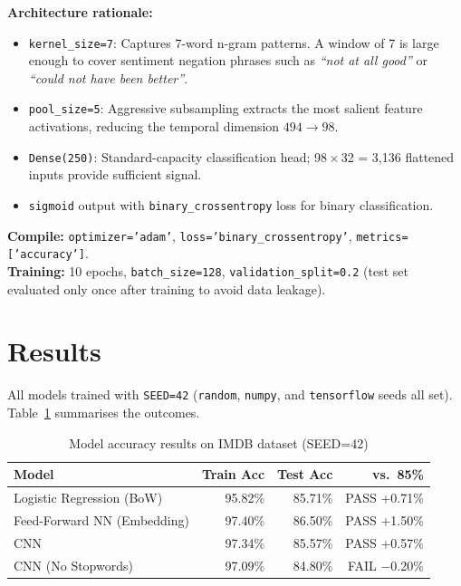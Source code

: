 \documentclass[12pt,a4paper]{article}
\begin{document}
\textbf{Architecture rationale:}
\begin{itemize}
  \item \texttt{kernel\_size=7}: Captures 7-word n-gram patterns. A window of 7 is large
        enough to cover sentiment negation phrases such as \textit{``not at all good''} or
        \textit{``could not have been better''}.
  \item \texttt{pool\_size=5}: Aggressive subsampling extracts the most salient feature
        activations, reducing the temporal dimension $494 \to 98$.
  \item \texttt{Dense(250)}: Standard-capacity classification head; 98\,$\times$\,32 = 3,136
        flattened inputs provide sufficient signal.
  \item \texttt{sigmoid} output with \texttt{binary\_crossentropy} loss for binary
        classification.
\end{itemize}

\textbf{Compile:} \texttt{optimizer='adam'}, \texttt{loss='binary\_crossentropy'},
\texttt{metrics=['accuracy']}.\\
\textbf{Training:} 10 epochs, \texttt{batch\_size=128}, \texttt{validation\_split=0.2}
(test set evaluated only once after training to avoid data leakage).

\section{Results}

All models trained with \texttt{SEED=42} (\texttt{random}, \texttt{numpy}, and
\texttt{tensorflow} seeds all set). Table~\ref{tab:results} summarises the outcomes.

\begin{table}[H]
  \centering
  \caption{Model accuracy results on IMDB dataset (SEED=42)}
  \label{tab:results}
  \begin{tabular}{lrrr}
    \toprule
    \textbf{Model} & \textbf{Train Acc} & \textbf{Test Acc} & \textbf{vs.\ 85\%} \\
    \midrule
    Logistic Regression (BoW)   & 95.82\% & 85.71\% & PASS +0.71\% \\
    Feed-Forward NN (Embedding) & 97.40\% & 86.50\% & PASS +1.50\% \\
    CNN                         & 97.34\% & 85.57\% & PASS +0.57\% \\
    CNN (No Stopwords)          & 97.09\% & 84.80\% & FAIL $-$0.20\% \\
    \bottomrule
  \end{tabular}
\end{table}
\end{document}
